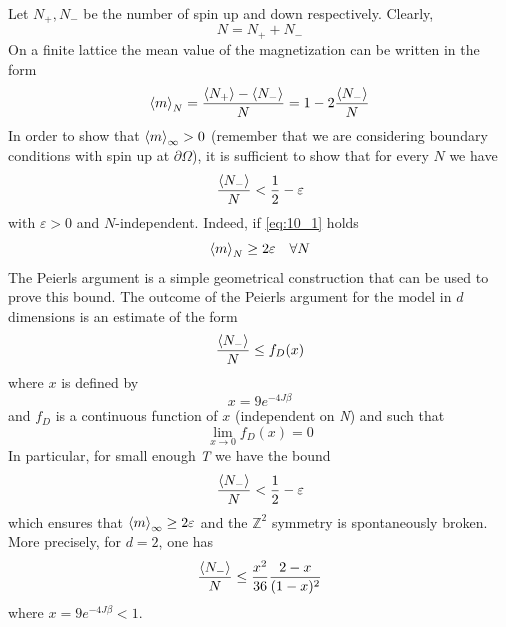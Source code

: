 \documentclass[../main/main.tex]{subfiles}
\begin{document}
Let \( N_+,N_- \) be the number of spin up and down respectively. Clearly,
\begin{equation*}
  N=N_+ + N_-  
\end{equation*}
On a finite lattice the mean value of the magnetization can be written in the form 
\begin{equation*}
  \expval{m}_N = \frac{\expval{N_+} - \expval{N_-}  }{N} = 1 - 2 \frac{\expval{N_-} }{N}
\end{equation*}
In order to show that \( \expval{m}_ \infty >0  \) (remember that we are considering boundary conditions with spin up at \( \partial{\Omega }  \)), it is sufficient to show that for every \(N\) we have 
\begin{equation}
  \frac{\expval{N_-} }{N}  < \frac{1}{2}- \varepsilon
  \label{eq:10_1}
\end{equation}
with \( \varepsilon >0 \) and \(N\)-independent.
Indeed, if \eqref{eq:10_1} holds
\begin{equation}
  \expval{m}_N \ge 2 \varepsilon \quad \forall N
\end{equation}
The Peierls argument is a simple geometrical construction that can be used to prove this
bound.
The outcome of the Peierls argument for the model in \(d\) dimensions is an estimate of the form
\begin{equation}
  \frac{\expval{N_-} }{N} \le f_D (x)
\end{equation}
where \(x\) is defined by 
\begin{equation}
  x = 9 e^{-4J \beta } 
\end{equation}
and \( f_D \) is a continuous function of \( x \) (independent on \emph{N}) and such that 
\begin{equation*}
\lim_{x \rightarrow 0} f_D (x) = 0    
\end{equation*}
In particular, for small enough \emph{T} we have the bound
\begin{equation*}
  \frac{\expval{N_-} }{N} < \frac{1}{2} - \varepsilon
\end{equation*}
which ensures that \(\expval{m}_\infty \ge 2\varepsilon  \) and the \(\mathbb{Z}^2\) symmetry is spontaneously broken.
More precisely, for \(d=2\), one has
\begin{equation}
    \frac{\expval{N_-} }{N} \le \frac{x^2}{36} \frac{2-x}{(1-x)^2}
\end{equation}
where \(   x = 9 e^{-4J \beta } < 1 \).
\end{document}
